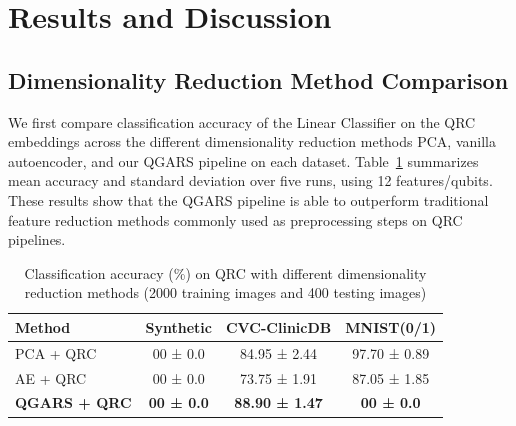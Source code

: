 \documentclass[conference]{IEEEtran}
\begin{document}
\section{Results and Discussion} \label{results_and_discussion}

\subsection{Dimensionality Reduction Method Comparison}
We first compare classification accuracy of the Linear Classifier on the QRC embeddings across the different dimensionality reduction methods PCA, vanilla autoencoder, and our QGARS pipeline on each dataset. Table~\ref{tab:qrc_reduction_accuracy} summarizes mean accuracy and standard deviation over five runs, using 12 features/qubits. These results show that the QGARS pipeline is able to outperform traditional feature reduction methods commonly used as preprocessing steps on QRC pipelines.

\begin{table}[!b]
  \caption{Classification accuracy (\%) on QRC with different dimensionality reduction methods (2000 training images and 400 testing images)}
  \label{tab:qrc_reduction_accuracy}
  \centering
  \begin{tabular}{lccc}
    \hline
    Method         & Synthetic  & CVC-ClinicDB & MNIST(0/1) \\
    \hline
    PCA + QRC      &  00 ± 0.0  &  84.95 ± 2.44    &  97.70 ± 0.89 \\
    AE + QRC       &  00 ± 0.0  &  73.75 ± 1.91    &  87.05 ± 1.85 \\
    \textbf{QGARS + QRC}    &  \textbf{00 ± 0.0} &  \textbf{88.90 ± 1.47} &  \textbf{00 ± 0.0} \\
    \hline
  \end{tabular}
\end{table}
\end{document}
